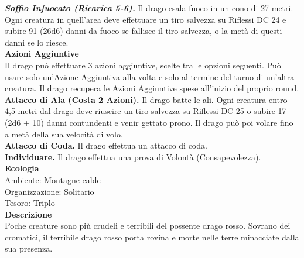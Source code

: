 \begin{multicols}{2}
\emph{\textbf{Soffio Infuocato (Ricarica 5-6).}} Il drago esala fuoco in un cono di 27 metri. Ogni creatura in quell'area deve effettuare un tiro salvezza su Riflessi DC 24 e subire 91 (26d6) danni da fuoco se fallisce il tiro salvezza, o la metà di questi danni se lo riesce.\\
\textbf{Azioni Aggiuntive}\\
Il drago può effettuare 3 azioni aggiuntive, scelte tra le opzioni seguenti. Può usare solo un'Azione Aggiuntiva alla volta e solo al termine del turno di un'altra creatura. Il drago recupera le Azioni Aggiuntive spese all'inizio del proprio round.\\
\textbf{Attacco di Ala (Costa 2 Azioni).} Il drago batte le ali. Ogni creatura entro 4,5 metri dal  drago deve riuscire un tiro salvezza su Riflessi DC 25 o subire 17 (2d6 + 10) danni contundenti e venir gettato prono. Il drago può poi volare fino a metà della sua velocità di volo.\\
\textbf{Attacco di Coda.} Il drago effettua un attacco di coda.\\
\textbf{Individuare.} Il drago effettua una prova di Volontà (Consapevolezza).\\	
\textbf{Ecologia}\\
Ambiente: Montagne calde\\
Organizzazione: Solitario\\
Tesoro: Triplo\\
\textbf{Descrizione}\\
Poche creature sono più crudeli e terribili del possente drago rosso. Sovrano dei cromatici, il terribile drago rosso porta rovina e morte nelle terre minacciate dalla sua presenza.\\


\end{multicols}
